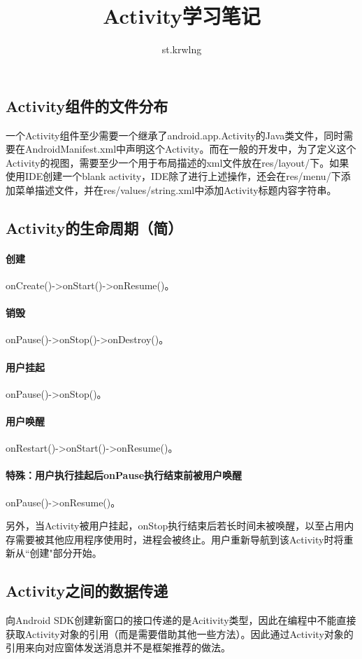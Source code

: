 \documentclass[UTF8]{ctexart}
\title{Activity学习笔记}
\author{st.krwlng}
\begin{document}
	\maketitle
	\tableofcontents
	\subsection{Activity组件的文件分布}
	一个Activity组件至少需要一个继承了android.app.Activity的Java类文件，同时需要在AndroidManifest.xml中声明这个Activity。而在一般的开发中，为了定义这个Activity的视图，需要至少一个用于布局描述的xml文件放在res/layout/下。如果使用IDE创建一个blank activity，IDE除了进行上述操作，还会在res/menu/下添加菜单描述文件，并在res/values/string.xml中添加Activity标题内容字符串。
	\subsection{Activity的生命周期（简）}
	\paragraph{创建} onCreate()->onStart()->onResume()。
	\paragraph{销毁} onPause()->onStop()->onDestroy()。
	\paragraph{用户挂起} onPause()->onStop()。
	\paragraph{用户唤醒} onRestart()->onStart()->onResume()。
	\paragraph{特殊：用户执行挂起后onPause执行结束前被用户唤醒} onPause()->onResume()。

	另外，当Activity被用户挂起，onStop执行结束后若长时间未被唤醒，以至占用内存需要被其他应用程序使用时，进程会被终止。用户重新导航到该Activity时将重新从“创建"部分开始。
	\subsection{Activity之间的数据传递}
	向Android SDK创建新窗口的接口传递的是Acitivity类型，因此在编程中不能直接获取Activity对象的引用（而是需要借助其他一些方法）。因此通过Activity对象的引用来向对应窗体发送消息并不是框架推荐的做法。
\end{document}
